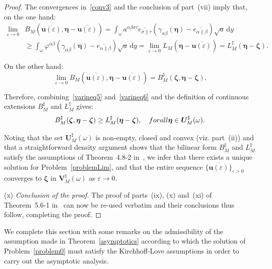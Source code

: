 \documentclass{amsart}
\def\dd{\, \mathrm{d}}
\begin{document}
\begin{proof}
The convergences in~\eqref{conv3} and the conclusion of part~(vii) imply that, on the one hand:
\begin{equation}
	\label{varineq5}
	\begin{aligned}
		\lim_{\varepsilon\to 0} &B_M\left(\overline{\bm{u}(\varepsilon)},\bm{\eta}-\overline{\bm{u}(\varepsilon)}\right) = \int_{\omega}a^{\alpha\beta\sigma\tau} \overline{e_{\sigma\|\tau}} \left(\gamma_{\alpha\beta}(\bm{\eta}) - \overline{e_{\alpha\|\beta}}\right) \sqrt{a} \dd y\\
		&\ge \int_{\omega} \varphi^{\alpha\beta} \left(\gamma_{\alpha\beta}(\bm{\eta}) - \overline{e_{\alpha\|\beta}}\right) \sqrt{a} \dd y=\lim_{\varepsilon\to 0}L_M\left(\bm{\eta}-\overline{\bm{u}(\varepsilon)}\right)=L_M^\sharp(\bm{\eta}-\bm{\zeta}).
	\end{aligned}
\end{equation}

On the other hand:
\begin{equation}
	\label{varineq6}
	\lim_{\varepsilon\to 0} B_M\left(\overline{\bm{u}(\varepsilon)},\bm{\eta}-\overline{\bm{u}(\varepsilon)}\right) = B_M^\sharp(\bm{\zeta},\bm{\eta}-\bm{\zeta}).
\end{equation}

Therefore, combining~\eqref{varineq5} and~\eqref{varineq6} and the definition of continuous extensions $B_M^\sharp$ and $L_M^\sharp$ gives:
\begin{equation*}
	B_M^\sharp(\bm{\zeta},\bm{\eta}-\bm{\zeta}) \ge L_M^\sharp(\bm{\eta}-\bm{\zeta}),\quad\textup{ for all }\bm{\eta}\in\bm{U}_M^\sharp(\omega).
\end{equation*}

Noting that the set $\bm{U}_M^\sharp(\omega)$ is non-empty, closed and convex (viz. part~(ii)) and that a straightforward density argument shows that the bilinear form $B_M^\sharp$ and $L_M^\sharp$ satisfy the assumptions of Theorem~4.8-2 in~\cite{Ciarlet2025}, we infer that there exists a unique solution for Problem~\ref{problemLim}, and that the entire sequence $\{\overline{\bm{u}(\varepsilon)}\}_{\varepsilon>0}$ converges to $\bm{\zeta}$ in $\bm{V}_M^\sharp(\omega)$ as $\varepsilon\to 0$.

(x) \emph{Conclusion of the proof.}
The proof of parts~(ix), (x) and~(xi) of Theorem~5.6-1 in~\cite{Ciarlet2000} can now be re-used verbatim and their conclusions thus follow, completing the proof.
\end{proof}

We complete this section with some remarks on the admissibility of the assumption made in Theorem~\ref{asymptotics} according to which the solution of Problem~\ref{problem0} must satisfy the Kirchhoff-Love assumptions in order to carry out the asymptotic analysis. 
		
\end{document}

